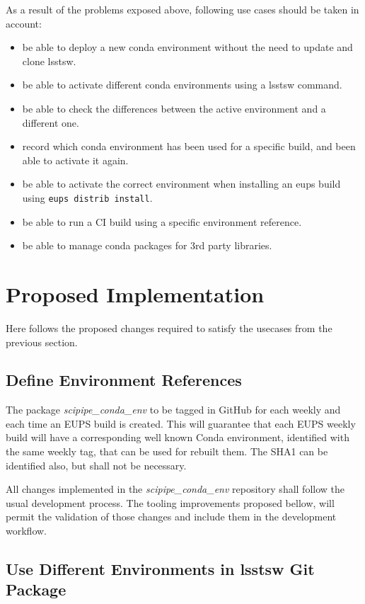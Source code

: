 As a result of the problems exposed above, following use cases should be taken in account:

\begin{itemize}
\item be able to deploy a new conda environment without the need to update and clone lsstsw.
\item be able to activate different conda environments using a lsstsw command.
\item be able to check the differences between the active environment and a different one.
\item record which conda environment has been used for a specific build, and been able to activate it again.
\item be able to activate the correct environment when installing an eups build using \texttt{eups distrib install}.
\item be able to run a CI build using a specific environment reference.
\item be able to manage conda packages for 3rd party libraries.
\end{itemize}


\newpage
\section{Proposed Implementation} \label{sec:proposed}

Here follows the proposed changes required to satisfy the usecases from the previous section.

\subsection{Define Environment References} \label{sec:envDefine}

The package \textit{scipipe\_conda\_env} to be tagged in GitHub for each weekly and each time an EUPS build is created.
This will guarantee that each EUPS weekly build will have a corresponding well known Conda environment, identified with the same weekly tag, that can be used for rebuilt them. 
The SHA1 can be identified also, but shall not be necessary.

All changes implemented in the \textit{scipipe\_conda\_env} repository shall follow the usual development process.  
The tooling improvements proposed bellow, will permit the validation of those changes and include them in the development workflow.


\subsection{Use Different Environments in lsstsw Git Package} \label{sec:envActivate}

